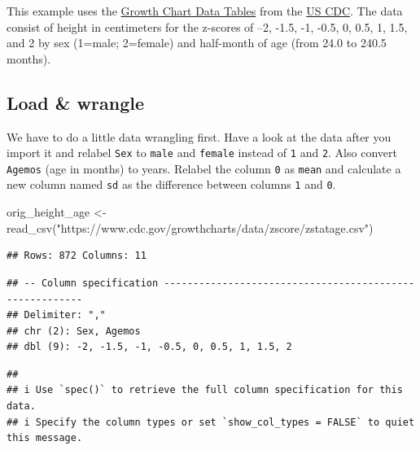 \documentclass[
  oneside]{book}
\newenvironment{Shaded}{\begin{snugshade}}{\end{snugshade}}
\newcommand{\FunctionTok}[1]{\textcolor[rgb]{0.00,0.00,0.00}{#1}}
\newcommand{\NormalTok}[1]{#1}
\newcommand{\OtherTok}[1]{\textcolor[rgb]{0.56,0.35,0.01}{#1}}
\newcommand{\StringTok}[1]{\textcolor[rgb]{0.31,0.60,0.02}{#1}}
\begin{document}
This example uses the \href{https://www.cdc.gov/growthcharts/data/zscore/zstatage.csv}{Growth Chart Data Tables} from the \href{https://www.cdc.gov/growthcharts/zscore.htm}{US CDC}. The data consist of height in centimeters for the z-scores of --2, -1.5, -1, -0.5, 0, 0.5, 1, 1.5, and 2 by sex (1=male; 2=female) and half-month of age (from 24.0 to 240.5 months).

\hypertarget{load-wrangle}{%
\subsection{Load \& wrangle}\label{load-wrangle}}

We have to do a little data wrangling first. Have a look at the data after you import it and relabel \texttt{Sex} to \texttt{male} and \texttt{female} instead of \texttt{1} and \texttt{2}. Also convert \texttt{Agemos} (age in months) to years. Relabel the column \texttt{0} as \texttt{mean} and calculate a new column named \texttt{sd} as the difference between columns \texttt{1} and \texttt{0}.

\begin{Shaded}
\begin{Highlighting}[]
\NormalTok{orig\_height\_age }\OtherTok{\textless{}{-}} \FunctionTok{read\_csv}\NormalTok{(}\StringTok{"https://www.cdc.gov/growthcharts/data/zscore/zstatage.csv"}\NormalTok{) }
\end{Highlighting}
\end{Shaded}

\begin{verbatim}
## Rows: 872 Columns: 11
\end{verbatim}

\begin{verbatim}
## -- Column specification --------------------------------------------------------
## Delimiter: ","
## chr (2): Sex, Agemos
## dbl (9): -2, -1.5, -1, -0.5, 0, 0.5, 1, 1.5, 2
\end{verbatim}

\begin{verbatim}
## 
## i Use `spec()` to retrieve the full column specification for this data.
## i Specify the column types or set `show_col_types = FALSE` to quiet this message.
\end{verbatim}
\end{document}
